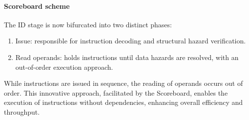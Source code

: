 \paragraph*{Scoreboard scheme}
The ID stage is now bifurcated into two distinct phases:
\begin{enumerate}
    \item Issue: responsible for instruction decoding and structural hazard verification.
    \item Read operands: holds instructions until data hazards are resolved, with an out-of-order execution approach.
\end{enumerate}
While instructions are issued in sequence, the reading of operands occurs out of order.
This innovative approach, facilitated by the Scoreboard, enables the execution of instructions without dependencies, enhancing overall efficiency and throughput.

